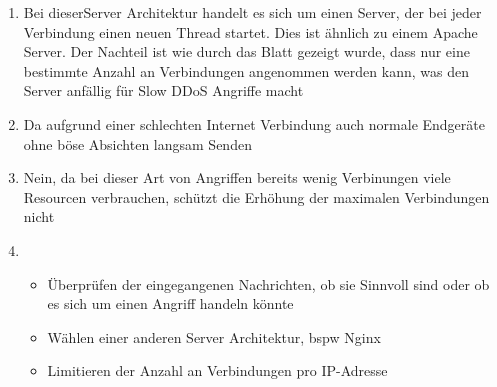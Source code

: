 \documentclass[a4paper,12pt,
headsepline,           %
twoside,               %
pointlessnumbers,      %
bibtotoc,              %
BCOR15mm               %
]{scrbook}
\begin{document}
\begin{enumerate}
    \item Bei dieserServer Architektur handelt es sich um einen Server, der bei jeder Verbindung einen neuen Thread startet. Dies ist ähnlich zu einem Apache Server. Der Nachteil ist wie durch das Blatt gezeigt wurde, dass nur eine bestimmte Anzahl an Verbindungen angenommen werden kann, was den Server anfällig für Slow DDoS Angriffe macht
    \item Da aufgrund einer schlechten Internet Verbindung auch normale Endgeräte ohne böse Absichten langsam Senden
    \item Nein, da bei dieser Art  von Angriffen bereits wenig Verbinungen viele Resourcen verbrauchen, schützt die Erhöhung der maximalen Verbindungen nicht
    \item \begin{itemize}
        \item Überprüfen der eingegangenen Nachrichten, ob sie Sinnvoll sind oder ob es sich um einen Angriff handeln könnte
        \item Wählen einer anderen Server Architektur, bspw Nginx
        \item Limitieren der Anzahl an Verbindungen pro IP-Adresse
    \end{itemize}
\end{enumerate}
\end{document}
